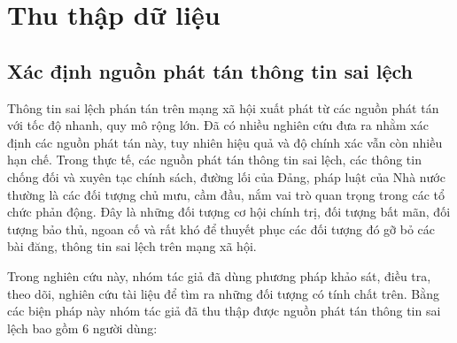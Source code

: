 \section{Thu thập dữ liệu}

\subsection{Xác định nguồn phát tán thông tin sai lệch} \label{4.1.1}
Thông tin sai lệch phán tán trên mạng xã hội xuất phát từ các nguồn phát tán với tốc độ nhanh, quy mô rộng lớn. Đã có nhiều nghiên cứu đưa ra nhằm xác định các nguồn phát tán này, tuy nhiên hiệu quả và độ chính xác vẫn còn nhiều hạn chế. Trong thực tế, các nguồn phát tán thông tin sai lệch, các thông tin chống đối và xuyên tạc chính sách, đường lối của Đảng, pháp luật của Nhà nước thường là các đối tượng chủ mưu, cầm đầu, nắm vai trò quan trọng trong các tổ chức phản động. Đây là những đối tượng cơ hội chính trị, đối tượng bất mãn, đối tượng bảo thủ, ngoan cố và rất khó để thuyết phục các đối tượng đó gỡ bỏ các bài đăng, thông tin sai lệch trên mạng xã hội.

Trong nghiên cứu này, nhóm tác giả đã dùng phương pháp khảo sát, điều tra, theo dõi, nghiên cứu tài liệu để tìm ra những đối tượng có tính chất trên. Bằng các biện pháp này nhóm tác giả đã thu thập được nguồn phát tán thông tin sai lệch bao gồm 6 người dùng:

